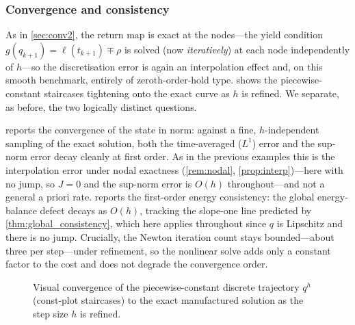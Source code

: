 \subsubsection{Convergence and consistency}\label{sec:conv3}

As in \cref{sec:conv2}, the return map is exact at the nodes---the yield
condition $g(q_{k+1})=\ell(t_{k+1})\mp\rho$ is solved (now
\emph{iteratively}) at each node independently of $h$---so the
discretisation error is again an interpolation effect and, on this smooth
benchmark, entirely of zeroth-order-hold type.  shows the
piecewise-constant staircases tightening onto the exact curve as $h$ is
refined. We separate, as before, the two logically distinct questions.

 reports the convergence of the state in norm:
against a fine, $h$-independent sampling of the exact solution, both the
time-averaged ($L^1$) error and the sup-norm error decay cleanly at first
order. As in the previous examples this is the interpolation error under
nodal exactness (\cref{rem:nodal}, \cref{prop:interp})---here with no
jump, so $J=0$ and the sup-norm error is $O(h)$ throughout---and not a
general a priori rate.  reports the
first-order energy consistency: the global energy-balance defect decays
as $O(h)$, tracking the slope-one line predicted by
\cref{thm:global_consistency}, which here applies throughout since $q$ is
Lipschitz and there is no jump. Crucially, the Newton iteration count
stays bounded---about three per step---under refinement, so the nonlinear
solve adds only a constant factor to the cost and does not degrade the
convergence order.

\begin{figure}[t]
  \centering
  \caption{Visual convergence of the piecewise-constant discrete
  trajectory $q^h$ (const-plot staircases) to the exact manufactured
  solution as the step size $h$ is refined.}
  \label{fig:traj3}
\end{figure}

